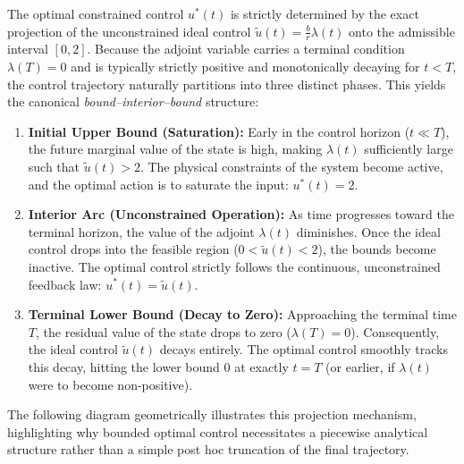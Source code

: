 \documentclass[11pt]{article}
\theoremstyle{definition}
\begin{document}
The optimal constrained control $u^*(t)$ is strictly determined by the exact projection of the unconstrained ideal control $\tilde u(t) = \frac{b}{r}\lambda(t)$ onto the admissible interval $[0, 2]$. Because the adjoint variable carries a terminal condition $\lambda(T)=0$ and is typically strictly positive and monotonically decaying for $t < T$, the control trajectory naturally partitions into three distinct phases. This yields the canonical \emph{bound--interior--bound} structure:

\begin{enumerate}[label=(\roman*)]
    \item \textbf{Initial Upper Bound (Saturation):} Early in the control horizon ($t \ll T$), the future marginal value of the state is high, making $\lambda(t)$ sufficiently large such that $\tilde u(t) > 2$. The physical constraints of the system become active, and the optimal action is to saturate the input: $u^*(t) = 2$.
    \item \textbf{Interior Arc (Unconstrained Operation):} As time progresses toward the terminal horizon, the value of the adjoint $\lambda(t)$ diminishes. Once the ideal control drops into the feasible region ($0 < \tilde u(t) < 2$), the bounds become inactive. The optimal control strictly follows the continuous, unconstrained feedback law: $u^*(t) = \tilde u(t)$.
    \item \textbf{Terminal Lower Bound (Decay to Zero):} Approaching the terminal time $T$, the residual value of the state drops to zero ($\lambda(T)=0$). Consequently, the ideal control $\tilde u(t)$ decays entirely. The optimal control smoothly tracks this decay, hitting the lower bound $0$ at exactly $t=T$ (or earlier, if $\lambda(t)$ were to become non-positive).
\end{enumerate}

The following diagram geometrically illustrates this projection mechanism, highlighting why bounded optimal control necessitates a piecewise analytical structure rather than a simple post hoc truncation of the final trajectory.
\end{document}
